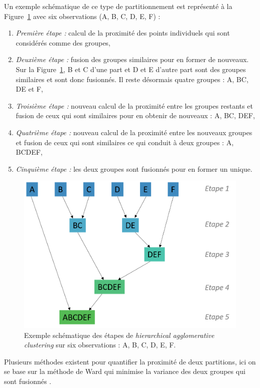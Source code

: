 Un exemple schématique de ce type de partitionnement est représenté à la Figure~\ref{Figure:tbr_hierarchical_agglomerative_clustering_example} avec six observations (A, B, C, D, E, F) :
\begin{enumerate}
\item \emph{Première étape :} calcul de la proximité des points individuels qui sont considérés comme des groupes,
\item \emph{Deuxième étape :} fusion des groupes similaires pour en former de nouveaux. Sur la Figure~\ref{Figure:tbr_hierarchical_agglomerative_clustering_example}, B et C d'une part et D et E
d'autre part sont des groupes similaires et sont donc fusionnés. Il reste désormais quatre groupes : A, BC, DE et F,
\item \emph{Troisième étape :} nouveau calcul de la proximité entre les groupes restants et fusion de ceux qui sont similaires pour en obtenir de nouveaux : A, BC, DEF,
\item \emph{Quatrième étape :} nouveau calcul de la proximité entre les nouveaux groupes et fusion de ceux qui sont similaires ce qui conduit à deux groupes : A, BCDEF,
\item \emph{Cinquième étape :} les deux groupes sont fusionnés pour en former un unique.
\end{enumerate}

\begin{figure}[h!]
  \centering
	\includegraphics[width=0.7\linewidth]{figures/chapter-4/tbr-hierarchical-agglomerative-clustering-example} 
  \caption{Exemple schématique des étapes de \textit{hierarchical agglomerative clustering} sur six observations : A, B, C, D, E, F.} 
	\label{Figure:tbr_hierarchical_agglomerative_clustering_example} 
\end{figure}

Plusieurs méthodes existent pour quantifier la proximité de deux partitions, ici on se base sur la méthode de Ward qui minimise 
la variance des deux groupes qui sont fusionnés \citep{Ward1963}.

